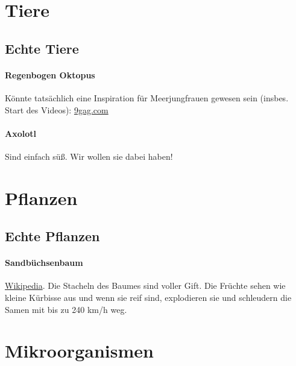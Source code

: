 \section{Tiere}
\subsection{Echte Tiere}
\paragraph{Regenbogen Oktopus} Könnte tatsächlich eine Inspiration für Meerjungfrauen gewesen sein (insbes. Start des Videos): \href{https://img-9gag-fun.9cache.com/photo/aVYpQVK\_460svvp9.webm}{9gag.com}
\paragraph{Axolotl} Sind einfach süß. Wir wollen sie dabei haben!

\section{Pflanzen}
\subsection{Echte Pflanzen}
\paragraph{Sandbüchsenbaum} \href{https://de.wikipedia.org/wiki/Sandb\%C3\%BCchsenbaum}{Wikipedia}. Die Stacheln des Baumes sind voller Gift. Die Früchte sehen wie kleine Kürbisse aus und wenn sie reif sind, explodieren sie und schleudern die Samen mit bis zu 240 km/h weg.

\section{Mikroorganismen}
